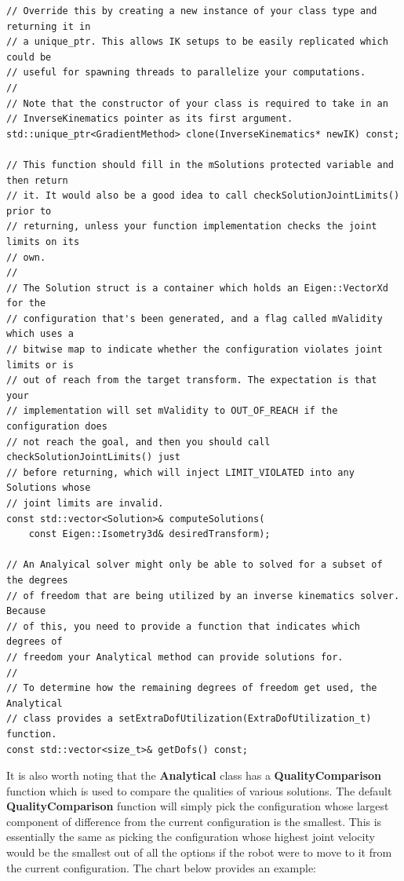 \begin{lstlisting}
// Override this by creating a new instance of your class type and returning it in
// a unique_ptr. This allows IK setups to be easily replicated which could be 
// useful for spawning threads to parallelize your computations.
//
// Note that the constructor of your class is required to take in an 
// InverseKinematics pointer as its first argument.
std::unique_ptr<GradientMethod> clone(InverseKinematics* newIK) const;

// This function should fill in the mSolutions protected variable and then return
// it. It would also be a good idea to call checkSolutionJointLimits() prior to
// returning, unless your function implementation checks the joint limits on its
// own.
//
// The Solution struct is a container which holds an Eigen::VectorXd for the
// configuration that's been generated, and a flag called mValidity which uses a
// bitwise map to indicate whether the configuration violates joint limits or is
// out of reach from the target transform. The expectation is that your 
// implementation will set mValidity to OUT_OF_REACH if the configuration does
// not reach the goal, and then you should call checkSolutionJointLimits() just
// before returning, which will inject LIMIT_VIOLATED into any Solutions whose
// joint limits are invalid.
const std::vector<Solution>& computeSolutions(
    const Eigen::Isometry3d& desiredTransform);

// An Analyical solver might only be able to solved for a subset of the degrees
// of freedom that are being utilized by an inverse kinematics solver. Because
// of this, you need to provide a function that indicates which degrees of
// freedom your Analytical method can provide solutions for.
//
// To determine how the remaining degrees of freedom get used, the Analytical
// class provides a setExtraDofUtilization(ExtraDofUtilization_t) function.
const std::vector<size_t>& getDofs() const;
\end{lstlisting}

It is also worth noting that the \textbf{Analytical} class has a \textbf{QualityComparison} function which is used to compare the qualities of various solutions. The default \textbf{QualityComparison} function will simply pick the configuration whose largest component of difference from the current configuration is the smallest. This is essentially the same as picking the configuration whose highest joint velocity would be the smallest out of all the options if the robot were to move to it from the current configuration. The chart below provides an example:


